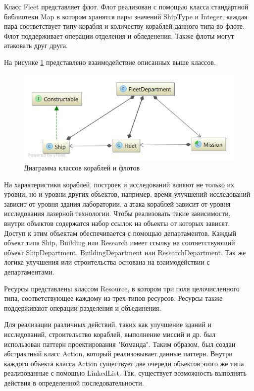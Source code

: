 Класс Fleet представляет флот. Флот реализован с помощью класса стандартной библиотеки Map в котором хранятся пары значений ShipType и Integer, каждая пара соответствует типу корабля и количеству кораблей данного типа во флоте. Флот поддерживает операции отделения и обледенения. Также флоты могут атаковать друг друга.

На рисунке \ref{pic:d5} представлено взаимодействие описанных выше классов. 
\begin{figure}[H]
\centering
\includegraphics[scale=0.5]{diagram5.png}
\caption{Диаграмма классов кораблей и флотов}
\label{pic:d5}
\end{figure}

На характеристики кораблей, построек и исследований влияют не только их уровни, но и уровни других объектов, например, время улучшений исследований зависит от уровня здания лаборатории, а атака кораблей зависит от уровня исследования лазерной технологии. Чтобы реализовать такие зависимости, внутри объектов содержатся набор ссылок на объекты от которых зависят. Доступ к этим объектам обеспечивается с помощью департаментов. Каждый объект типа Ship, Building или Research имеет ссылку на соответствующий объект ShipDepartment, BuildingDepartment или ResearchDepartment. Так же логика улучшения или строительства основана на взаимодействии с департаментами.


Ресурсы представлены классом Resource, в котором три поля целочисленного типа, соответствующее каждому из трех типов ресурсов. Ресурсы также поддерживают операции разделения и объединения.

Для реализации различных действий, таких как улучшение зданий и исследований, строительство кораблей, выполнение миссий и др. был использован паттерн проектирования "Команда". Таким образом, был создан абстрактный класс Action, который реализовывает данные паттерн. Внутри каждого объекта класса Action существует две очереди объектов этого же типа реализованные с помощью LinkedList. Так, существует возможность выполнять действия в определенной последовательности. 

